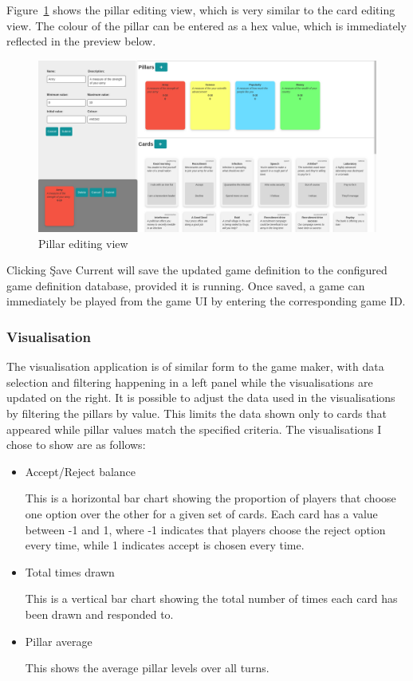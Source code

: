 Figure~\ref{fig:pillar_edit} shows the pillar editing view, which is very similar to the card editing view. The colour of the pillar can be entered as a hex value, which is immediately reflected in the preview below.

\begin{figure}[!h]
	\centering
	\includegraphics[width=1.0\textwidth]{./images/design/pillar_edit.png}
	\caption{Pillar editing view}
	\label{fig:pillar_edit}
\end{figure}

Clicking \c{Save Current} will save the updated game definition to the configured game definition database, provided it is running. Once saved, a game can immediately be played from the game UI by entering the corresponding game ID.

\subsubsection{Visualisation}

The visualisation application is of similar form to the game maker, with data selection and filtering happening in a left panel while the visualisations are updated on the right.
It is possible to adjust the data used in the visualisations by filtering the pillars by value. This limits the data shown only to cards that appeared while pillar values match the specified criteria. The visualisations I chose to show are as follows:
\begin{itemize}
	\item Accept/Reject balance

	      This is a horizontal bar chart showing the proportion of players that choose one option over the other for a given set of cards. Each card has a value between -1 and 1, where -1 indicates that players choose the reject option every time, while 1 indicates accept is chosen every time.

	\item Total times drawn

	      This is a vertical bar chart showing the total number of times each card has been drawn and responded to.

	\item Pillar average

	      This shows the average pillar levels over all turns.
\end{itemize}

